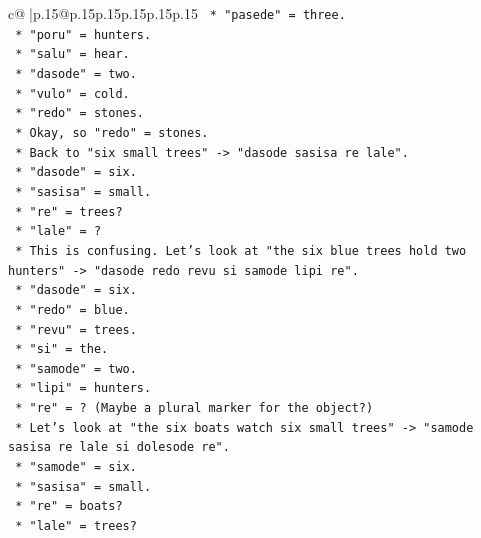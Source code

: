 \documentclass{article}
\begin{document}
{\begin{supertabular}{c@{$\;$}|p{.15\linewidth}@{}p{.15\linewidth}p{.15\linewidth}p{.15\linewidth}p{.15\linewidth}p{.15\linewidth}}
{{{\texttt{                        *   "pasede" = three.} \\
\texttt{                        *   "poru" = hunters.} \\
\texttt{                        *   "salu" = hear.} \\
\texttt{                        *   "dasode" = two.} \\
\texttt{                        *   "vulo" = cold.} \\
\texttt{                        *   "redo" = stones.} \\
\texttt{                    *   Okay, so "redo" = stones.} \\
\texttt{                    *   Back to "six small trees" {-}> "dasode sasisa re lale".} \\
\texttt{                        *   "dasode" = six.} \\
\texttt{                        *   "sasisa" = small.} \\
\texttt{                        *   "re" = trees?} \\
\texttt{                        *   "lale" = ?} \\
\texttt{                    *   This is confusing. Let's look at "the six blue trees hold two hunters" {-}> "dasode redo revu si samode lipi re".} \\
\texttt{                        *   "dasode" = six.} \\
\texttt{                        *   "redo" = blue.} \\
\texttt{                        *   "revu" = trees.} \\
\texttt{                        *   "si" = the.} \\
\texttt{                        *   "samode" = two.} \\
\texttt{                        *   "lipi" = hunters.} \\
\texttt{                        *   "re" = ? (Maybe a plural marker for the object?)} \\
\texttt{                    *   Let's look at "the six boats watch six small trees" {-}> "samode sasisa re lale si dolesode re".} \\
\texttt{                        *   "samode" = six.} \\
\texttt{                        *   "sasisa" = small.} \\
\texttt{                        *   "re" = boats?} \\
\texttt{                        *   "lale" = trees?} \\
}}}
\end{supertabular}}
\end{document}
